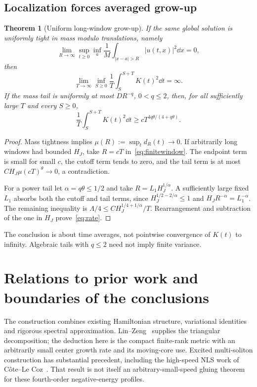 \documentclass[11pt,a4paper]{article}
\newtheorem{theorem}{Theorem}[section]
\theoremstyle{remark}\newtheorem{remark}[theorem]{Remark}
\begin{document}
\subsection{Localization forces averaged grow-up}
\begin{theorem}[Uniform long-window grow-up]\label{thm:grow}
If the same global solution is uniformly tight in mass modulo translations, namely
\[
 \lim_{R\to\infty}\sup_{t\ge0}\inf_a
 \frac1M\int_{|x-a|>R}|u(t,x)|^2\dd x=0,
\]
then
\[
 \lim_{T\to\infty}\inf_{S\ge0}\frac1T\int_S^{S+T}K(t)^2\dd t=\infty.
\]
If the mass tail is uniformly at most $DR^{-q}$, $0<q\le2$, then, for all sufficiently large $T$ and every $S\ge0$,
\begin{equation}\label{eq:rate}
 \frac1T\int_S^{S+T}K(t)^2\dd t
 \ge cT^{4q\theta/(4+q\theta)}.
\end{equation}
\end{theorem}
\begin{proof}
Mass tightness implies $\mu(R):=\sup_td_R(t)\to0$. If arbitrarily long windows had bounded $H_J$, take $R=cT$ in~\eqref{eq:finitewindow}. The endpoint term is small for small $c$, the cutoff term tends to zero, and the tail term is at most $CH_J\mu(cT)^\theta\to0$, a contradiction.

For a power tail let $\alpha=q\theta\le1/2$ and take $R=L_1H_J^{1/\alpha}$. A sufficiently large fixed $L_1$ absorbs both the cutoff and tail terms, since $H_J^{1/2-2/\alpha}\le1$ and $H_JR^{-\alpha}=L_1^{-\alpha}$. The remaining inequality is $\Lambda/4\le C H_J^{1/4+1/\alpha}/T$. Rearrangement and subtraction of the one in $H_J$ prove~\eqref{eq:rate}.
\end{proof}
The conclusion is about time averages, not pointwise convergence of $K(t)$ to infinity. Algebraic tails with $q\le2$ need not imply finite variance.

\section{Relations to prior work and boundaries of the conclusions}\label{sec:context}
The construction combines existing Hamiltonian structure, variational identities and rigorous spectral approximation. Lin--Zeng~\cite{LZ} supplies the triangular decomposition; the deduction here is the compact finite-rank metric with an arbitrarily small center growth rate and its moving-core use. Excited multi-soliton construction has substantial precedent, including the high-speed NLS work of C\^ote--Le Coz~\cite{CL}. That result is not itself an arbitrary-small-speed gluing theorem for these fourth-order negative-energy profiles.
\end{document}
